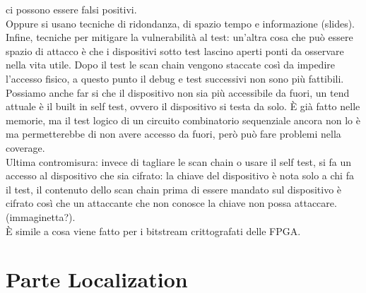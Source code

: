 \documentclass[oneside, 12pt]{extbook}
\begin{document}
ci possono essere falsi positivi.\\Oppure si usano tecniche di ridondanza, di spazio tempo e informazione (slides).\\Infine, tecniche per mitigare la vulnerabilità al test: un'altra cosa che può essere spazio di attacco è che i dispositivi sotto test lascino aperti ponti da osservare nella vita utile. Dopo il test le scan chain vengono staccate così da impedire l'accesso fisico, a questo punto il debug e test successivi non sono più fattibili.\\Possiamo anche far si che il dispositivo non sia più accessibile da fuori, un tend attuale è il built in self test, ovvero il dispositivo si testa da solo. È già fatto nelle memorie, ma il test logico di un circuito combinatorio sequenziale ancora non lo è ma permetterebbe di non avere accesso da fuori, però può fare problemi nella coverage.\\Ultima contromisura: invece di tagliare le scan chain o usare il self test, si fa un accesso al dispositivo che sia cifrato: la chiave del dispositivo è nota solo a chi fa il test, il contenuto dello scan chain prima di essere mandato sul dispositivo è cifrato così che un attaccante che non conosce la chiave non possa attaccare. (immaginetta?).\\È simile a cosa viene fatto per i bitstream crittografati delle FPGA.

\part{Parte Localization}
\end{document}
